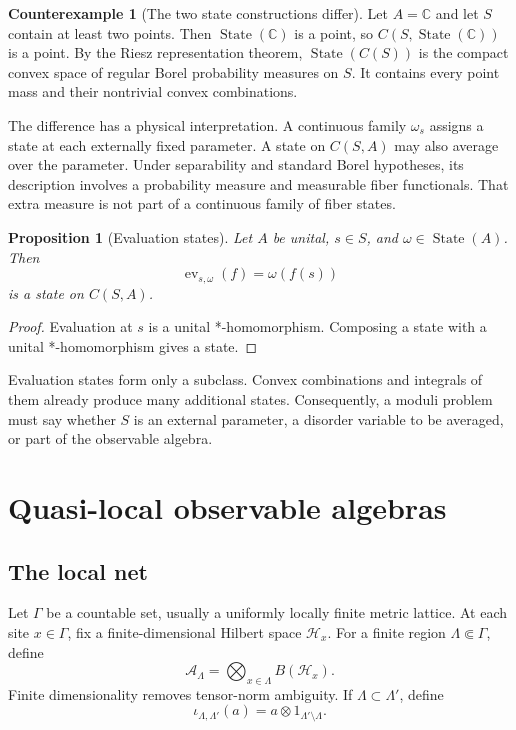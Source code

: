\documentclass[12pt]{article}
\newtheorem{proposition}[theorem]{Proposition}
\theoremstyle{definition}
\newtheorem{counterexample}[theorem]{Counterexample}
\theoremstyle{remark}
\newcommand{\C}{\mathbb C}
\newcommand{\A}{\mathcal A}
\newcommand{\State}{\operatorname{State}}
\begin{document}
\begin{counterexample}[The two state constructions differ]\label{ce:states}
Let $A=\C$ and let $S$ contain at least two points.  Then $\State(\C)$ is a point, so
$C(S,\State(\C))$ is a point.  By the Riesz representation theorem,
$\State(C(S))$ is the compact convex space of regular Borel probability measures on
$S$.  It contains every point mass and their nontrivial convex combinations.
\end{counterexample}

The difference has a physical interpretation.  A continuous family $\omega_s$
assigns a state at each externally fixed parameter.  A state on $C(S,A)$ may also
average over the parameter.  Under separability and standard Borel hypotheses, its
description involves a probability measure and measurable fiber functionals.  That
extra measure is not part of a continuous family of fiber states.

\begin{proposition}[Evaluation states]
Let $A$ be unital, $s\in S$, and $\omega\in\State(A)$.  Then
\[
\operatorname{ev}_{s,\omega}(f)=\omega(f(s))
\]
is a state on $C(S,A)$.
\end{proposition}

\begin{proof}
Evaluation at $s$ is a unital *-homomorphism.  Composing a state with a unital
*-homomorphism gives a state.
\end{proof}

Evaluation states form only a subclass.  Convex combinations and integrals of them
already produce many additional states.  Consequently, a moduli problem must say
whether $S$ is an external parameter, a disorder variable to be averaged, or part of
the observable algebra.

\section{Quasi-local observable algebras}

\subsection{The local net}

Let $\Gamma$ be a countable set, usually a uniformly locally finite metric lattice.
At each site $x\in\Gamma$, fix a finite-dimensional Hilbert space $\mathcal H_x$.
For a finite region $\Lambda\Subset\Gamma$, define
\[
\A_\Lambda
=
\bigotimes_{x\in\Lambda}B(\mathcal H_x).
\]
Finite dimensionality removes tensor-norm ambiguity.  If
$\Lambda\subset\Lambda'$, define
\[
\iota_{\Lambda,\Lambda'}(a)
=
a\otimes1_{\Lambda'\setminus\Lambda}.
\]
\end{document}
